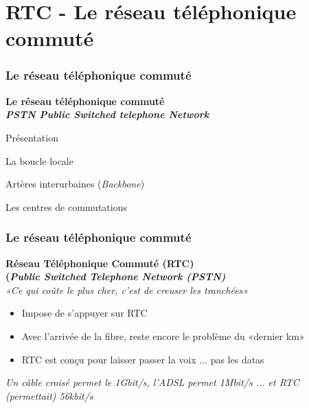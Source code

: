 \section{RTC - Le réseau téléphonique commuté}

\begin{frame}[fragile]
	\frametitle{Le réseau téléphonique commuté}
\begin{center}
	\Huge{\bf\color{blue}Le réseau téléphonique commuté \\ 
	\LARGE\it PSTN Public Switched telephone Network}
\end{center}
\begin{flushright}
  \item Présentation
  \item La boucle locale
  \item Artères interurbaines (\textit{Backbone})
  \item Les centres de commutations
\end{flushright}
\end{frame}


\begin{frame}[fragile]
  \frametitle{Le réseau téléphonique commuté}
{\large\bf Réseau Téléphonique Commuté (RTC) \\
(\textit{Public Switched Telephone Network (PSTN)}}\\
\textit{«Ce qui coûte le plus cher, c'est de creuser les tranchées»}
\begin{itemize}
	\item Impose de s'appuyer sur RTC
	\item Avec l'arrivée de la fibre, reste encore le problème du «dernier km»
	\item RTC est conçu pour laisser passer la voix ... pas les datas
\end{itemize}
\vspace{1cm}
\textit{Un câble croisé permet le 1Gbit/s, l'ADSL permet 1Mbit/s ... et RTC
(permettait) 56kbit/s}
\end{frame}

